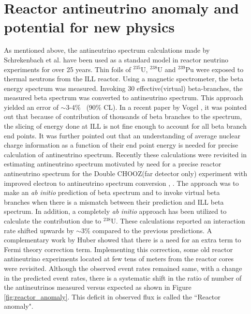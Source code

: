 \documentclass[11pt]{article}
\numberwithin{equation}{section}
\begin{document}
\section[Reactor antineutrino anomaly]{Reactor antineutrino anomaly and potential for new physics}
\label{sec:reactoranomaly}
As mentioned above, the antineutrino spectrum calculations made by Schrekenbach et al.\cite{Schreckenbach1985325} have been used as a standard model in reactor neutrino experiments for over 25 years. Thin foils of $^{235}$\textrm{U}, $^{ 238}$\textrm{U} and $ ^{ 239}\textrm{Pu}$  were exposed to thermal neutrons from the ILL reactor. Using a magnetic spectrometer, the beta energy spectrum was measured. Invoking 30 effective(virtual) beta-branches, the measured beta spectrum was converted to antineutrino spectrum. This approach yielded an error of $\sim$3-4\%~ (90\% CL). In a recent paper by Vogel \cite{Vogelconversion}, it was pointed out that because of contribution of thousands of beta branches to the spectrum, the slicing of energy done at ILL is not fine enough to account for all beta branch end points. It was further pointed out that an understanding of average nuclear charge information as a function of their end point energy is needed for precise calculation of antineutrino spectrum. Recently these calculations were revisited in estimating antineutrino spectrum motivated by need for a precise reactor antineutrino spectrum for the Double CHOOZ(far detector only) experiment with improved electron to antineutrino spectrum conversion \cite{2011reactorspectrum}, \cite{mention2011reactor}. The approach was to make an \textit{ab initio} prediction of beta spectrum and to invoke virtual beta branches when there is a mismatch between their prediction and ILL beta spectrum. In addition, a completely \textit{ab initio} approach has been utilized to calculate the contribution due to $^{238}$\textrm{U}. These calculations reported an interaction rate shifted upwards by $\sim$3\% compared to the previous predictions. A complementary work by Huber \cite{Huber} showed that there is a need for an extra term to Fermi theory correction term. Implementing this correction, some old reactor antineutrino experiments located at few tens of meters from the reactor cores were revisited. Although the observed event rates remained same, with a change in the predicted event rates, there is a systematic shift in the ratio of number of the antineutrinos measured versus expected as shown in Figure \ref{fig:reactor_anomaly}. This deficit in observed flux is called the ``Reactor anomaly". 
\end{document}

